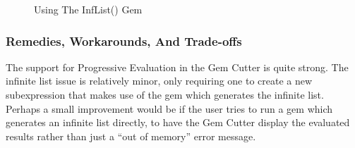 \begin{figure}[htp]
  \begin{center}
     \quad
  \end{center}
  \caption{Using The InfList() Gem}
  \label{fig:gcInfList}
\end{figure}

\subsubsection{Remedies, Workarounds, And Trade-offs}

The support for Progressive Evaluation in the Gem Cutter is quite strong.  The infinite list issue is relatively minor, only requiring one to create a new subexpression that makes use of the gem which generates the infinite list.  Perhaps a small improvement would be if the user tries to run a gem which generates an infinite list directly, to have the Gem Cutter display the evaluated results rather than just a ``out of memory'' error message.


